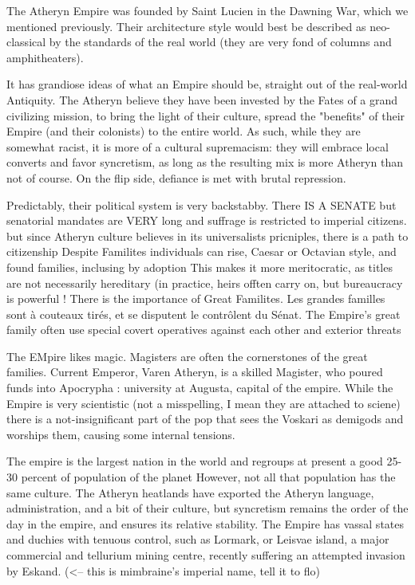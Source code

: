 The Atheryn Empire was founded by Saint Lucien in the Dawning War, which we mentioned previously. Their architecture style would best be described as neo-classical by the standards of the real world (they are very fond of columns and amphitheaters).

It has grandiose ideas of what an Empire should be, straight out of the real-world Antiquity. The Atheryn believe they have been invested by the Fates of a grand civilizing mission, to bring the light of their culture, spread the "benefits" of their Empire (and their colonists) to the entire world. As such, while they are somewhat racist, it is more of a cultural supremacism: they will embrace local converts and favor syncretism, as long as the resulting mix is more Atheryn than not of course. On the flip side, defiance is met with brutal repression. 

Predictably, their political system is very backstabby. 
There IS A SENATE but senatorial mandates are VERY long and suffrage is restricted to imperial citizens. but since Atheryn culture believes in its universalists pricniples, there is a path to citizenship
Despite Familites individuals can rise, Caesar or Octavian style, and found families, inclusing by adoption
This makes it more meritocratic, as titles are not necessarily hereditary (in practice, heirs offten carry on, but bureaucracy is powerful !
There is the importance of Great Familites. Les grandes familles sont à couteaux tirés, et se disputent le contrôlent du Sénat. The Empire's great family often use special covert operatives against each other and exterior threats 


The EMpire likes magic. Magisters are often the cornerstones of the great families. Current Emperor, Varen Atheryn, is a skilled Magister, who poured funds into Apocrypha : university at Augusta, capital of the empire. While the Empire is very scientistic (not a misspelling, I mean they are attached to sciene) there is a not-insignificant part of the pop that sees the Voskari as demigods and worships them, causing some internal tensions. 


The empire is the largest nation in the world and regroups at present a good 25-30 percent of population of the planet However, not all that population has the same culture. The Atheryn heatlands have exported the Atheryn language, administration, and a bit of their culture, but syncretism remains the order of the day in the empire, and ensures its relative stability. 
The Empire has vassal states and duchies with tenuous control, such as Lormark, or Leisvae island, a major commercial and tellurium mining centre, recently suffering an attempted invasion by Eskand. (<-- this is mimbraine's imperial name, tell it to flo)



